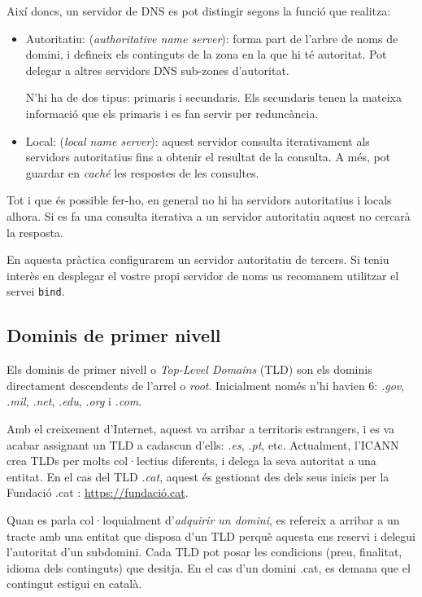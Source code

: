 \documentclass{practicaitic}
\begin{document}
Així doncs, un servidor de DNS es pot distingir segons la funció que realitza:

\begin{itemize}
  \item Autoritatiu: (\textit{authoritative name server}): forma part de l'arbre
    de noms de domini, i defineix
    els continguts de la zona en la que hi té autoritat. Pot delegar a altres
    servidors DNS sub-zones d'autoritat.

    N'hi ha de dos tipus: primaris i secundaris. Els secundaris tenen la mateixa
    informació que els primaris i es fan servir per reduncància.
  \item Local: (\textit{local name server}): aquest servidor consulta iterativament
    als servidors autoritatius fins a obtenir el resultat de la consulta. A més, pot
    guardar en \textit{caché} les respostes de les consultes.
\end{itemize}

Tot i que és possible fer-ho, en general no hi ha servidors autoritatius
i locals alhora. Si es fa una consulta iterativa a un servidor autoritatiu aquest
no cercarà la resposta.

En aquesta pràctica configurarem un servidor autoritatiu de tercers. Si teniu
interès en desplegar el vostre propi servidor de noms us recomanem utilitzar
el servei \texttt{bind}.

\subsection{Dominis de primer nivell}

Els dominis de primer nivell o \textit{Top-Level Domains} (TLD) son els dominis
directament descendents de l'arrel o \textit{root}. Inicialment només n'hi havien
6: \textit{.gov}, \textit{.mil}, \textit{.net}, \textit{.edu}, \textit{.org} i \textit{.com}.

Amb el creixement d'Internet, aquest va arribar a territoris estrangers, i es va acabar
assignant un TLD a cadascun d'ells: \textit{.es}, \textit{.pt}, etc. Actualment,
l'ICANN crea TLDs per molts col·lectius diferents, i delega la seva
autoritat a una entitat. En el cas del TLD \textit{.cat}, aquest és gestionat des
dels seus inicis per la Fundació .cat : \url{https://fundació.cat}.

Quan es parla col·loquialment d'\textit{adquirir un domini}, es refereix
a arribar a un tracte amb una entitat que disposa d'un TLD perquè aquesta
ens reservi i delegui l'autoritat d'un subdomini. Cada TLD pot posar les
condicions (preu, finalitat, idioma dels continguts) que desitja. En el cas
d'un domini .cat, es demana que el contingut estigui en català.
\end{document}
